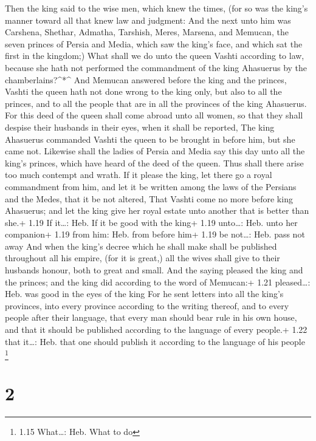  Then the king said to the wise men, which knew the times,
(for so was the king's manner toward all that knew law and judgment:
 And the next unto him was Carshena, Shethar, Admatha,
Tarshish, Meres, Marsena, and Memucan, the seven princes of Persia and
Media, which saw the king's face, and which sat the first in the
kingdom;)  What shall we do unto the queen Vashti according
to law, because she hath not performed the commandment of the king
Ahasuerus by the chamberlains?\^{}*\^{}  And Memucan
answered before the king and the princes, Vashti the queen hath not done
wrong to the king only, but also to all the princes, and to all the
people that are in all the provinces of the king Ahasuerus.
 For this deed of the queen shall come abroad unto all
women, so that they shall despise their husbands in their eyes, when it
shall be reported, The king Ahasuerus commanded Vashti the queen to be
brought in before him, but she came not.  Likewise shall
the ladies of Persia and Media say this day unto all the king's princes,
which have heard of the deed of the queen. Thus shall there arise too
much contempt and wrath.  If it please the king, let there
go a royal commandment from him, and let it be written among the laws of
the Persians and the Medes, that it be not altered, That Vashti come no
more before king Ahasuerus; and let the king give her royal estate unto
another that is better than she.+ 1.19 If it\ldots: Heb. If it be good
with the king+ 1.19 unto\ldots: Heb. unto her companion+ 1.19 from him:
Heb. from before him+ 1.19 be not\ldots: Heb. pass not away
 And when the king's decree which he shall make shall be
published throughout all his empire, (for it is great,) all the wives
shall give to their husbands honour, both to great and small.
 And the saying pleased the king and the princes; and the
king did according to the word of Memucan:+ 1.21 pleased\ldots: Heb. was
good in the eyes of the king  For he sent letters into all
the king's provinces, into every province according to the writing
thereof, and to every people after their language, that every man should
bear rule in his own house, and that it should be published according to
the language of every people.+ 1.22 that it\ldots: Heb. that one should
publish it according to the language of his people \footnote{1.15
  What\ldots: Heb. What to do}

\hypertarget{section-1}{%
\section{2}\label{section-1}}

